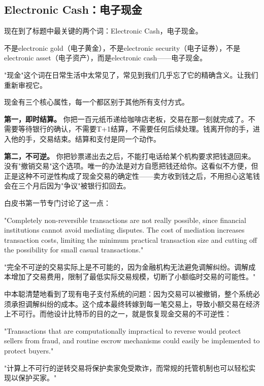 \documentclass[a4paper,12pt,openany]{ctexbook}
\newenvironment{quoting}{%
  \par\vspace{0.5em}%
  \begin{list}{}{%
    \setlength{\leftmargin}{2em}%
    \setlength{\rightmargin}{2em}%
    \setlength{\parsep}{0.3em}%
    \setlength{\itemsep}{0pt}%
    \setlength{\topsep}{0pt}%
  }%
  \item\relax
}{%
  \end{list}%
  \par\vspace{0.5em}%
}
\begin{document}
\subsection*{Electronic Cash：电子现金}


现在到了标题中最关键的两个词：Electronic Cash，电子现金。

不是electronic gold（电子黄金），不是electronic security（电子证券），不是electronic asset（电子资产），而是electronic cash——电子现金。

"现金"这个词在日常生活中太常见了，常见到我们几乎忘了它的精确含义。让我们重新审视它。

现金有三个核心属性，每一个都区别于其他所有支付方式。

\textbf{第一，即时结算。} 你把一百元纸币递给咖啡店老板，交易在那一刻就完成了。不需要等待银行的确认，不需要T+1结算，不需要任何后续处理。钱离开你的手，进入他的手，交易结束。结算和支付是同一个动作。

\textbf{第二，不可逆。} 你把钞票递出去之后，不能打电话给某个机构要求把钱退回来。没有"撤销交易"这个选项。唯一的办法是对方自愿把钱还给你。这看似不方便，但正是这种不可逆性构成了现金交易的确定性——卖方收到钱之后，不用担心这笔钱会在三个月后因为"争议"被银行扣回去。

白皮书第一节专门讨论了这一点：


\begin{quoting}
\small
"Completely non-reversible transactions are not really possible, since financial institutions cannot avoid mediating disputes. The cost of mediation increases transaction costs, limiting the minimum practical transaction size and cutting off the possibility for small casual transactions."

"完全不可逆的交易实际上是不可能的，因为金融机构无法避免调解纠纷。调解成本增加了交易费用，限制了最低实际交易规模，切断了小额临时交易的可能性。"
\end{quoting}


中本聪清楚地看到了现有电子支付系统的问题：因为交易可以被撤销，整个系统必须承担调解纠纷的成本。这个成本最终转嫁到每一笔交易上，导致小额交易在经济上不可行。而他设计比特币的目的之一，就是恢复现金交易的不可逆性：


\begin{quoting}
\small
"Transactions that are computationally impractical to reverse would protect sellers from fraud, and routine escrow mechanisms could easily be implemented to protect buyers."

"计算上不可行的逆转交易将保护卖家免受欺诈，而常规的托管机制也可以轻松实现以保护买家。"
\end{quoting}
\end{document}
